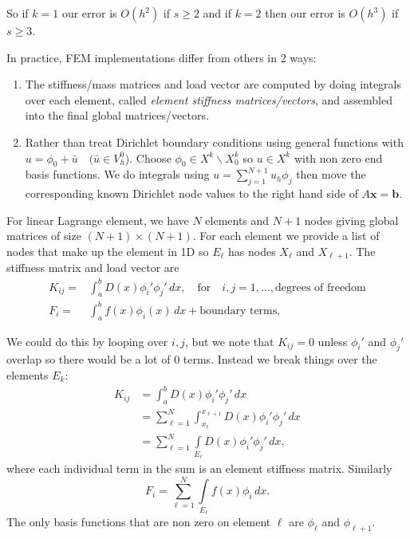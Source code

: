 \documentclass[12pt, a4paper]{article}
\renewcommand{\vec}[1]{\mathbf{#1}}
\theoremstyle{definition}
\theoremstyle{remark}
\numberwithin{equation}{section}
\begin{document}
So if $k=1$ our error is $O(h^2)$ if $s \ge 2$ and if $k=2$ then our error is $O(h^3)$ if $s \ge 3$.

In practice, FEM implementations differ from others in 2 ways:
\begin{enumerate}
\item The stiffness/mass matrices and load vector are computed by doing integrals over each element, called \emph{element stiffness matrices/vectors}, and assembled into the final global matrices/vectors.
\item Rather than treat Dirichlet boundary conditions using general functions with $u=\phi_0 + \bar{u} \quad (\bar{u} \in V_h^0$). Choose $\phi_0 \in X^k \backslash X_0^k$ so $u\in X^k$ with non zero end basis functions. We do integrals using $u=\sum\limits_{j=1}^{N+1}u_h\phi_j$ then move the corresponding known Dirichlet node values to the right hand side of $A\vec{x}=\vec{b}$.
\end{enumerate}

For linear Lagrange element,  we have $N$ elements and $N+1$ nodes giving global matrices of size \mbox{$(N+1) \times (N+1)$}. For each element we provide a list of nodes that make up the element in 1D so $E_{\ell}$ has nodes $X_{\ell}$ and $X_{\ell+1}$. The stiffness matrix and load vector are
\begin{align*}
K_{ij}=&\int_a^b D(x) \phi_i' \phi_j' \, dx, \quad \text{for} \quad i,j=1,\dots,\mbox{degrees of freedom}\\
F_i =& \int_a^b f(x)\phi_i(x)\, dx + \mbox{boundary terms}, 
\end{align*}

We could do this by looping over $i,j$, but we note that $K_{ij}=0$ unless $\phi_i'$ and $\phi_j'$ overlap so there would be a lot of 0 terms.
Instead we break things over the elements $E_k$:
\begin{align*}
K_{ij} &= \int_a^b D(x) \phi_i' \phi_j' \, dx\\
&= \sum_{\ell=1}^{N} \int_{x_{\ell}}^{x_{{\ell}+1}}D(x) \phi_i' \phi_j' \, dx\\
&= \sum_{\ell=1}^N \int\limits_{E_{\ell}} D(x) \phi_i' \phi_j' \, dx,
\end{align*}
where each individual term in the sum is an element stiffness matrix.
Similarly
\begin{equation*}
F_i = \sum_{\ell=1}^N \int\limits_{E_{\ell}} f(x)\phi_i \, dx.
\end{equation*}
 The only basis functions that are non zero on element $\ell$ are $\phi_{\ell}$ and $\phi_{\ell+1}$. 
\end{document}
